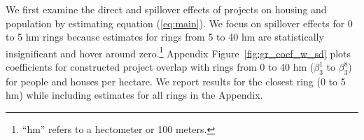 \documentclass[12pt]{article}
\newcommand{\hmref}{
	``hm'' refers to a hectometer or 100 meters.
}
\begin{document}




We first examine the direct and spillover effects of projects on housing and population by estimating equation (\ref{eq:main}).  We focus on spillover effects for 0 to 5 hm rings because estimates for rings from 5 to 40 hm  are statistically insignificant and hover around zero.\footnote{\hmref}  Appendix Figure~\ref{fig:gr_coef_w_sd} plots coefficients for constructed project overlap with rings from 0 to 40 hm ($\beta_3^{1}$ to $\beta_3^{8}$) for people and houses per hectare.  We report results for the closest ring (0 to 5 hm) while including estimates for all rings in the Appendix.
\end{document}

